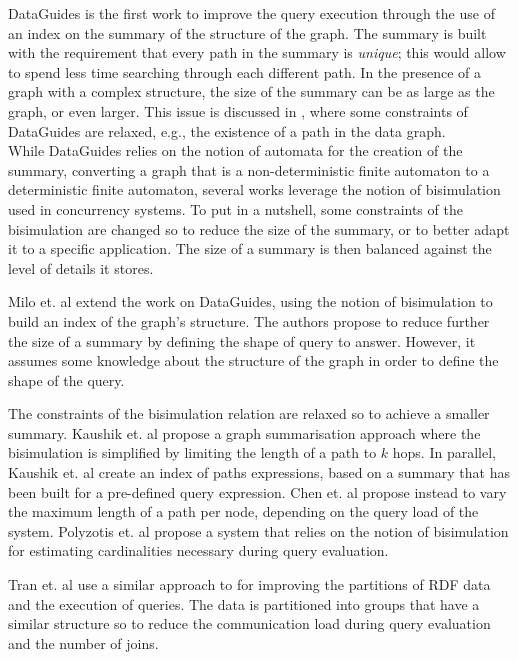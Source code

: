 DataGuides \cite{goldman1997dataguides} is the first work to improve the query execution through the use of an index on the summary of the structure of the graph. The summary is built with the requirement that every path in the summary is \emph{unique}; this would allow to spend less time searching through each different path. In the presence of a graph with a complex structure, the size of the summary can be as large as the graph, or even larger. This issue is discussed in \cite{goldman1999approximate}, where some constraints of DataGuides are relaxed, e.g., the existence of a path in the data graph.\\

While DataGuides relies on the notion of automata for the creation of the summary, converting a graph that is a non-deterministic finite automaton to a deterministic finite automaton, several works leverage the notion of bisimulation~\cite{park:1981:cai} used in concurrency systems. To put in a nutshell, some constraints of the bisimulation are changed so to reduce the size of the summary, or to better adapt it to a specific application. The size of a summary is then balanced against the level of details it stores.

Milo et. al \cite{Milo:1999:ISP:645503.656266} extend the work on DataGuides, using the notion of bisimulation to build an index of the graph's structure. The authors propose to reduce further the size of a summary by defining the shape of query to answer. However, it assumes some knowledge about the structure of the graph in order to define the shape of the query.

The constraints of the bisimulation relation are relaxed so to achieve a smaller summary. Kaushik et. al \cite{kaushik:de:2002} propose a graph summarisation approach where the bisimulation is simplified by limiting the length of a path to $k$ hops. In parallel, Kaushik et. al \cite{kaushik:2002:cib} create an index of paths expressions, based on a summary that has been built for a pre-defined query expression.
Chen et. al \cite{chen:2003:dia} propose instead to vary the maximum length of a path per node, depending on the query load of the system. Polyzotis et. al \cite{polyzotis:2006:xsx} propose a system that relies on the notion of bisimulation for estimating cardinalities necessary during query evaluation.

Tran et. al \cite{Tran:2012:kde} use a similar approach to \cite{kaushik:2002:cib} for improving the partitions of RDF data and the execution of queries. The data is partitioned into groups that have a similar structure so to reduce the communication load during query evaluation and the number of joins.

